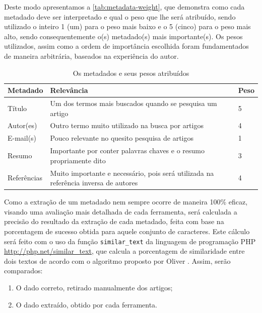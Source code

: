 Deste modo apresentamos a \autoref{tab:metadata-weight}, que demonstra como cada metadado deve ser interpretado e qual o peso que lhe será atribuído, sendo utilizado o inteiro 1 (um) para o peso mais baixo e o 5 (cinco) para o peso mais alto, sendo consequentemente o(s) metadado(s) mais importante(s). Os pesos utilizados, assim como a ordem de importância escolhida foram fundamentados de maneira arbitrária, baseados na experiência do autor.


\begin{table}
    \caption{Os metadados e seus pesos atribuídos}
    \begin{center}
        \begin{tabular}{|p{3cm}|p{8cm}|C{1cm}|}
            \hline \textbf{Metadado} & \textbf{Relevância} & \textbf{Peso} \\ 
            \hline Título & Um dos termos mais buscados quando se pesquisa um artigo & 5 \\
            \hline Autor(es) & Outro termo muito utilizado na busca por artigos & 4 \\
            \hline E-mail(s) & Pouco relevante no quesito pesquisa de artigos & 1 \\
            \hline Resumo & Importante por conter palavras chaves e o resumo propriamente dito & 3 \\
            \hline Referências & Muito importante e necessário, pois será utilizada na referência inversa de autores & 4 \\
            \hline 
        \end{tabular} 
    \end{center}
    \label{tab:metadata-weight}
\end{table}

Como a extração de um metadado nem sempre ocorre de maneira 100\% eficaz, visando uma avaliação mais detalhada de cada ferramenta, será calculada a precisão do resultado da extração de cada metadado, feita com base na porcentagem de sucesso obtida para aquele conjunto de caracteres. Este cálculo será feito com o uso da função \texttt{similar\_text} da linguagem de programação PHP \url{http://php.net/similar_text}, que calcula a porcentagem de similaridade entre dois textos de acordo com o algoritmo proposto por Oliver \cite{oliver-1993}. Assim, serão comparados:

\begin{enumerate}
    \item O dado correto, retirado manualmente dos artigos;
    \item O dado extraído, obtido por cada ferramenta.
\end{enumerate}

